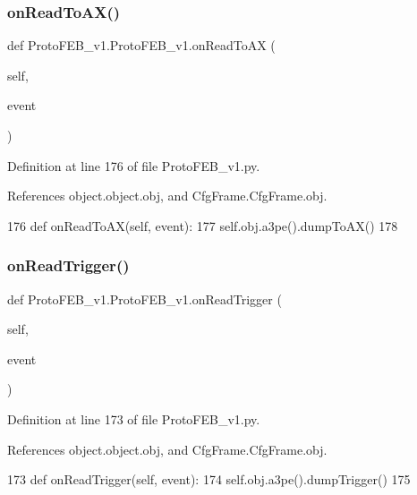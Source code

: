 \subsubsection{\texorpdfstring{on\+Read\+To\+A\+X()}{onReadToAX()}}
{\footnotesize\ttfamily def Proto\+F\+E\+B\+\_\+v1.\+Proto\+F\+E\+B\+\_\+v1.\+on\+Read\+To\+AX (\begin{DoxyParamCaption}\item[{}]{self,  }\item[{}]{event }\end{DoxyParamCaption})}



Definition at line 176 of file Proto\+F\+E\+B\+\_\+v1.\+py.



References object.\+object.\+obj, and Cfg\+Frame.\+Cfg\+Frame.\+obj.


\begin{DoxyCode}
176     \textcolor{keyword}{def }onReadToAX(self, event):
177         self.obj.a3pe().dumpToAX()
178 
\end{DoxyCode}
\mbox{\label{classProtoFEB__v1_1_1ProtoFEB__v1_a3c2db844a47acc8436134752581902f0}} 
\subsubsection{\texorpdfstring{on\+Read\+Trigger()}{onReadTrigger()}}
{\footnotesize\ttfamily def Proto\+F\+E\+B\+\_\+v1.\+Proto\+F\+E\+B\+\_\+v1.\+on\+Read\+Trigger (\begin{DoxyParamCaption}\item[{}]{self,  }\item[{}]{event }\end{DoxyParamCaption})}



Definition at line 173 of file Proto\+F\+E\+B\+\_\+v1.\+py.



References object.\+object.\+obj, and Cfg\+Frame.\+Cfg\+Frame.\+obj.


\begin{DoxyCode}
173     \textcolor{keyword}{def }onReadTrigger(self, event):
174         self.obj.a3pe().dumpTrigger()
175 
\end{DoxyCode}
\mbox{\label{classProtoFEB__v1_1_1ProtoFEB__v1_ab186e2261ac831a15d991615fc09a85e}} 
